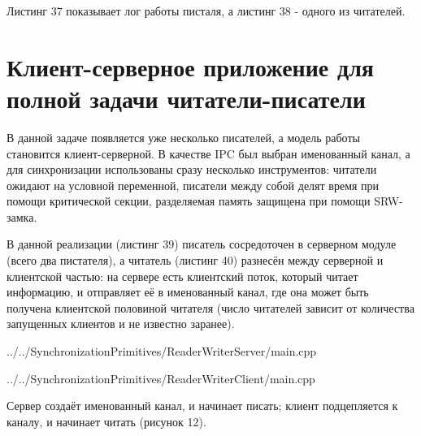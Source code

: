 \documentclass[a4paper, 12pt]{article}		%
\begin{document}
Листинг 37 показывает лог работы писталя, а листинг 38 - одного из читателей.





\newpage
\section{Клиент-серверное приложение для полной задачи читатели-писатели}

В данной задаче появляется уже несколько писателей, а модель работы становится клиент-серверной. В качестве IPC был выбран именованный канал, а для синхронизации использованы сразу несколько инструментов: читатели ожидают на условной переменной, писатели между собой делят время при помощи критической секции, разделяемая память защищена при помощи SRW-замка.

В данной реализации (листинг 39) писатель сосредоточен в серверном модуле (всего два пистателя), а читатель (листинг 40) разнесён между серверной и клиентской частью: на сервере есть клиентский поток, который читает информацию, и отправляет её в именованный канал, где она может быть получена клиентской половиной читателя (число читателей зависит от количества запущенных клиентов и не известно заранее).


{../../SynchronizationPrimitives/ReaderWriterServer/main.cpp}



{../../SynchronizationPrimitives/ReaderWriterClient/main.cpp}

Сервер создаёт именованный канал, и начинает писать; клиент подцепляется к каналу, и начинает читать (рисунок 12).
\end{document}
